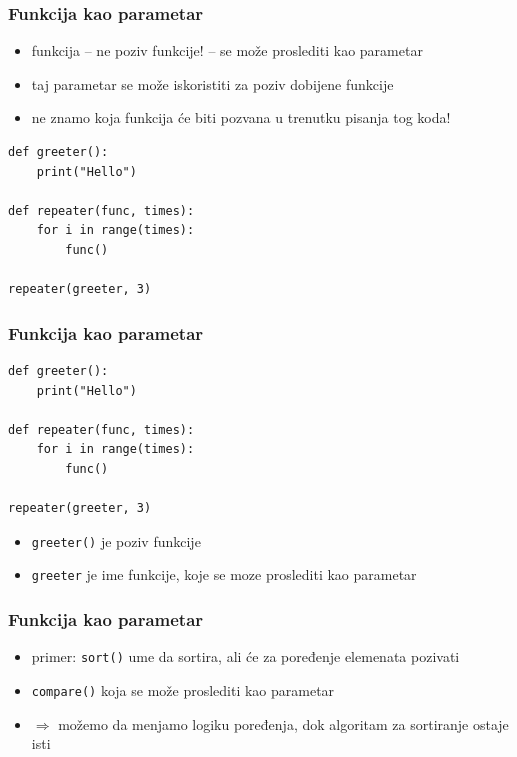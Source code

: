 \documentclass[compress]{beamer}
\begin{document}
\begin{frame}[fragile]
  \frametitle{Funkcija kao parametar}
  \begin{itemize}
    \item funkcija -- ne poziv funkcije! -- se može proslediti kao parametar
    \item taj parametar se može iskoristiti za poziv dobijene funkcije
    \item ne znamo koja funkcija će biti pozvana u trenutku pisanja tog koda!
  \end{itemize}
\begin{verbatim}
def greeter():
    print("Hello")

def repeater(func, times):
    for i in range(times):
        func()

repeater(greeter, 3)
\end{verbatim}
\end{frame}

\begin{frame}[fragile]
  \frametitle{Funkcija kao parametar}
\begin{verbatim}
def greeter():
    print("Hello")

def repeater(func, times):
    for i in range(times):
        func()

repeater(greeter, 3)
\end{verbatim}
  \begin{itemize}
    \item \texttt{greeter()} je poziv funkcije
    \item \texttt{greeter} je ime funkcije, koje se moze proslediti kao parametar
  \end{itemize}
\end{frame}

\begin{frame}[fragile]
  \frametitle{Funkcija kao parametar}
  \begin{itemize}
    \item primer: \texttt{sort()} ume da sortira, ali će za poređenje elemenata pozivati
    \item \texttt{compare()} koja se može proslediti kao parametar
    \item $\Rightarrow$ možemo da menjamo logiku poređenja, dok algoritam za sortiranje ostaje isti
  \end{itemize}
\end{frame}
\end{document}
